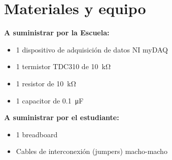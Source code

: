 \documentclass[12pt,letterpaper]{report}
\newcommand{\mat}{Materiales y equipo}
\begin{document}
\section{\mat}
\textbf{A suministrar por la Escuela:}
\begin{itemize}
\item 1 dispositivo de adquisición de datos NI myDAQ
\item 1 termistor TDC310 de \SI{10}{\kilo\ohm} 
\item 1 resistor de \SI{10}{\kilo\ohm}
\item 1 capacitor de \SI{0.1}{\micro\farad}

\end{itemize}
\textbf{A suministrar por el estudiante:}
\begin{itemize}
\item 1 breadboard
\item Cables de interconexión (jumpers) macho-macho
\end{itemize}
\end{document}
